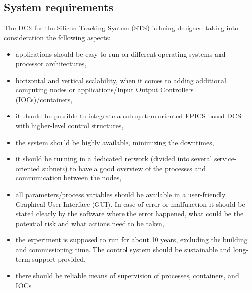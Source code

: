 




\subsection{System requirements}
 The \gls{DCS} for the Silicon Tracking System (\gls{STS}) is being designed taking into consideration the following aspects:
 \begin{itemize}
     \item applications should be easy to run on different operating systems and processor architectures,
     \item horizontal and vertical scalability, when it comes to adding additional computing nodes or applications/Input Output Controllers (\glspl{IOC})/containers,
     \item it should be possible to integrate a sub-system oriented \gls{EPICS}-based \gls{DCS} with higher-level control structures,
     \item the system should be highly available, minimizing the downtimes,
     \item it should be running in a dedicated network (divided into several service-oriented subnets) to have a good overview of the processes and communication between the nodes,
     \item all parameters/process variables should be available in a user-friendly Graphical User Interface (\gls{GUI}). In case of error or malfunction it should be stated clearly by the software where the error happened, what could be the potential risk and what actions need to be taken,
     \item the experiment is supposed to run for about 10 years, excluding the building and commissioning time. The control system should be sustainable and long-term support provided,
     \item there should be reliable means of supervision of processes, containers, and \glspl{IOC}.
 \end{itemize}

